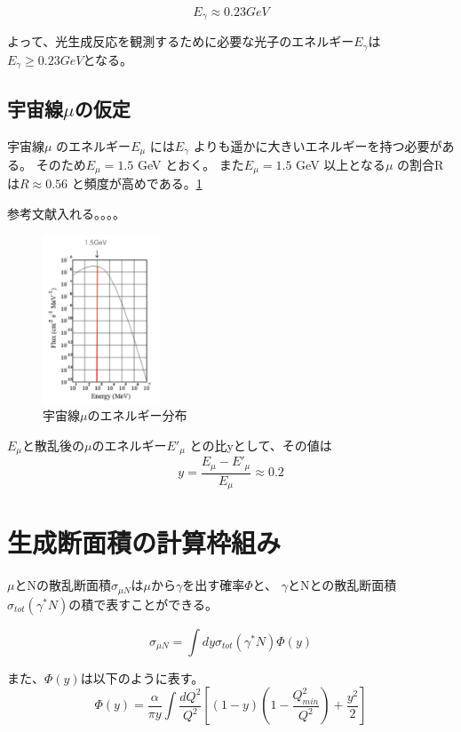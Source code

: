 \begin{equation}
    E_\gamma \approx 0.23 GeV
\end{equation}

よって、光生成反応を観測するために必要な光子のエネルギー$E_\gamma$は
$E_\gamma \geq 0.23 GeV$となる。

\subsection{宇宙線$\mu$の仮定}
宇宙線$\mu$ のエネルギー$E_\mu$ には$E_\gamma$ よりも遥かに大きいエネルギーを持つ必要がある。
そのため$E_\mu = 1.5$ GeV とおく。
また$E_\mu = 1.5$ GeV 以上となる$\mu$ の割合Rは$R \approx 0.56$ と頻度が高めである。\ref{fig:test3}

参考文献入れる。。。。

\begin{figure}[H]
    \centering
    \includegraphics[height=5cm]{img/cosimic_ray_energy_distribution.png}
    \caption{宇宙線$\mu$のエネルギー分布}
    \label{fig:test3}
\end{figure}

$E_\mu$と散乱後の$\mu$のエネルギー$E'_\mu$ との比yとして、その値は
\begin{equation}
    y = \dfrac{E_\mu - E'_\mu}{E_\mu} \approx 0.2
\end{equation}

\section{生成断面積の計算枠組み}
$\mu$とNの散乱断面積$\sigma_{\mu N}$は$\mu$から$\gamma$を出す確率$\Phi$と、
$\gamma$とNとの散乱断面積$\sigma_{tot}(\gamma^* N)$の積で表すことができる。

\begin{equation}
    \sigma_{\mu N} =\int dy  \sigma_{tot}(\gamma^* N) \Phi(y)
\end{equation}

また、$\Phi(y)$は以下のように表す。
\begin{equation}
    \Phi(y) = \dfrac{\alpha}{\pi y} \int \dfrac{dQ^2}{Q^2} [(1-y)(1 - \dfrac{Q^2_{min}}{Q^2}) + \dfrac{y^2}{2}]
\end{equation}

